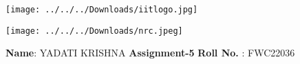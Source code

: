 \documentclass[10pt,a4paper]{report}
\begin{document}
\begin{figure*}[!tbp]
  \centering
  \begin{minipage}[b]{0.4\textwidth}
\texttt{[image: ../../../Downloads/iitlogo.jpg]} 
  \end{minipage}
  \hfill
  \vspace{5mm}\begin{minipage}[b]{0.4\textwidth}
\raggedleft  \texttt{[image: ../../../Downloads/nrc.jpeg]} 

  \end{minipage}\vspace{0.2cm}
\end{figure*}
\raggedright \textbf{Name}:\hspace{1mm} YADATI KRISHNA\hspace{3cm} \Large \textbf{Assignment-5}\hspace{2.5cm} %
\normalsize \textbf{Roll No.} :\hspace{1mm} FWC22036\vspace{1cm}
\end{document}
